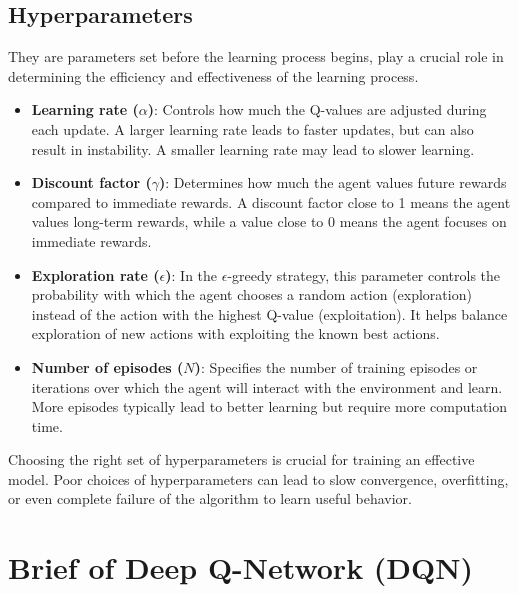 \subsection{Hyperparameters}
They are parameters set before the learning process begins, play a crucial role in determining the efficiency and effectiveness of the learning process. 
\begin{itemize}
    \item \textbf{Learning rate ($\alpha$)}: Controls how much the Q-values are adjusted during each update. A larger learning rate leads to faster updates, but can also result in instability. A smaller learning rate may lead to slower learning.
    \item \textbf{Discount factor ($\gamma$)}: Determines how much the agent values future rewards compared to immediate rewards. A discount factor close to 1 means the agent values long-term rewards, while a value close to 0 means the agent focuses on immediate rewards.
    \item \textbf{Exploration rate ($\epsilon$)}: In the $\epsilon$-greedy strategy, this parameter controls the probability with which the agent chooses a random action (exploration) instead of the action with the highest Q-value (exploitation). It helps balance exploration of new actions with exploiting the known best actions.
    \item \textbf{Number of episodes ($N$)}: Specifies the number of training episodes or iterations over which the agent will interact with the environment and learn. More episodes typically lead to better learning but require more computation time.
\end{itemize}
Choosing the right set of hyperparameters is crucial for training an effective model. Poor choices of hyperparameters can lead to slow convergence, overfitting, or even complete failure of the algorithm to learn useful behavior.

\section{Brief of Deep Q-Network (DQN)}

